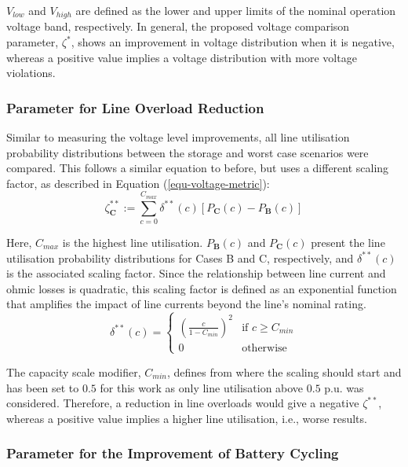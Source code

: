 $V_{low}$ and $V_{high}$ are defined as the lower and upper limits of the nominal operation voltage band, respectively. In general, the proposed voltage comparison parameter, $\zeta^*$, shows an improvement in voltage distribution when it is negative, whereas a positive value implies a voltage distribution with more voltage violations.

\subsubsection{Parameter for Line Overload Reduction}

Similar to measuring the voltage level improvements, all line utilisation probability distributions between the storage and worst case scenarios were compared. This follows a similar equation to before, but uses a different scaling factor, as described in Equation (\ref{equ-voltage-metric}):
\begin{equation}
 \zeta_\textbf{C}^{**} := \sum_{c = 0}^{C_{max}} \delta^{**}(c) \left[P_\textbf{C}(c) - P_\textbf{B}(c)\right]
 \label{equ-utilisation-metric}
\end{equation}

Here, $C_{max}$ is the highest line utilisation. $P_\textbf{B}(c)$ and $P_\textbf{C}(c)$ present the line utilisation probability distributions for Cases {B} and {C}, respectively, and $\delta^{**}(c)$ is the associated scaling factor. Since the relationship between line current and ohmic losses is quadratic, this scaling factor is defined as an exponential function that amplifies the impact of line currents beyond the line's nominal rating.
\begin{equation}
 \delta^{**}(c) = 
 \begin{cases} 
 \left(\frac{c}{1-C_{min}}\right)^2 & \text{if } c \geq C_{min} \\
 0 & \text{otherwise}
 \end{cases}
\end{equation}

The capacity scale modifier, $C_{min}$, defines from where the scaling should start and has been set to $0.5$ for this work as only line utilisation above $0.5$ p.u. was considered. Therefore, a reduction in line overloads would give a negative $\zeta^{**}$, whereas a positive value implies a higher line utilisation, i.e., worse results.

\subsubsection{Parameter for the Improvement of Battery Cycling}
\label{subsubsec-zeta-3}

